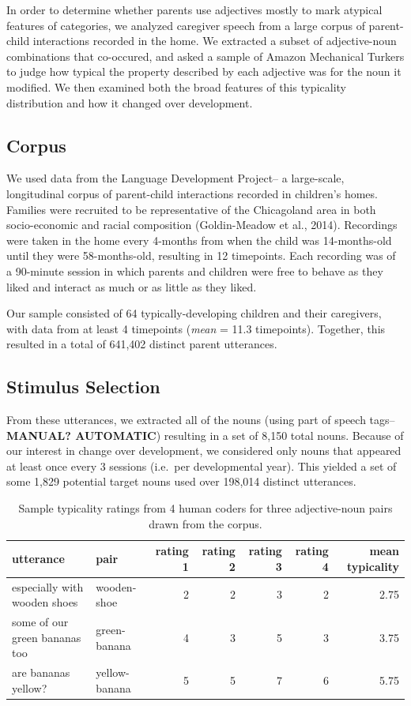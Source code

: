 \documentclass[10pt, letterpaper]{article}
\begin{document}
In order to determine whether parents use adjectives mostly to mark
atypical features of categories, we analyzed caregiver speech from a
large corpus of parent-child interactions recorded in the home. We
extracted a subset of adjective-noun combinations that co-occured, and
asked a sample of Amazon Mechanical Turkers to judge how typical the
property described by each adjective was for the noun it modified. We
then examined both the broad features of this typicality distribution
and how it changed over development.

\hypertarget{corpus}{%
\subsection{Corpus}\label{corpus}}

We used data from the Language Development Project-- a large-scale,
longitudinal corpus of parent-child interactions recorded in children's
homes. Families were recruited to be representative of the Chicagoland
area in both socio-economic and racial composition (Goldin-Meadow et
al., 2014). Recordings were taken in the home every 4-months from when
the child was 14-months-old until they were 58-months-old, resulting in
12 timepoints. Each recording was of a 90-minute session in which
parents and children were free to behave as they liked and interact as
much or as little as they liked.

Our sample consisted of 64 typically-developing children and their
caregivers, with data from at least 4 timepoints (\emph{mean} = 11.3
timepoints). Together, this resulted in a total of 641,402 distinct
parent utterances.

\hypertarget{stimulus-selection}{%
\subsection{Stimulus Selection}\label{stimulus-selection}}

From these utterances, we extracted all of the nouns (using part of
speech tags--\textbf{MANUAL? AUTOMATIC}) resulting in a set of 8,150
total nouns. Because of our interest in change over development, we
considered only nouns that appeared at least once every 3 sessions
(i.e.~per developmental year). This yielded a set of some 1,829
potential target nouns used over 198,014 distinct utterances.

\begin{table}[tb]
\centering
\begin{tabular}{llrrrrr}
  \hline
utterance & pair & rating 1 & rating 2 & rating 3 & rating 4 & mean typicality \\ 
  \hline
especially with wooden shoes & wooden-shoe &   2 &   2 &   3 &   2 & 2.75 \\ 
  some of our green bananas too & green-banana &   4 &   3 &   5 &   3 & 3.75 \\ 
  are bananas yellow? & yellow-banana &   5 &   5 &   7 &   6 & 5.75 \\ 
   \hline
\end{tabular}
\caption{Sample typicality ratings from 4 human coders for three adjective-noun pairs drawn from the corpus.} 
\label{tab:utt_table}
\end{table}
\end{document}
